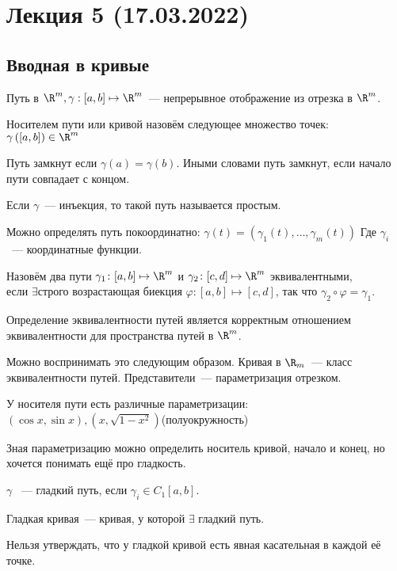 \section*{Лекция 5 (17.03.2022)}
\subsection{Вводная в кривые}
\begin{definition}
    Путь в $\R^m, \gamma : [a, b] \mapsto \R^m$~--- непрерывное отображение из отрезка в $\R^m$.
\end{definition}
\begin{definition}
    Носителем пути или кривой назовём следующее множество точек: $\gamma\left([a, b]\right)\in \R^m$
\end{definition}
\begin{definition}
    Путь замкнут если $\gamma(a) = \gamma(b)$. Иными словами путь замкнут, если начало пути совпадает с концом.
\end{definition}
\begin{definition}
    Если $\gamma$~--- инъекция, то такой путь называется
    простым.
\end{definition}
\begin{remark}
    Можно определять путь покоординатно:
    $\gamma(t) = (\gamma_1(t),\dots, \gamma_m(t))$ 
    Где $\gamma_i$~--- координатные функции.
\end{remark}
\begin{definition}
    Назовём два пути $\gamma_1\colon [a,b]\mapsto \R^m$ и
    $\gamma_2\colon [c,d]\mapsto \R^m$ эквивалентными,\\
    если $\exists \text{строго возрастающая биекция }
    \varphi\colon [a,b]\mapsto[c, d]$, так что 
    $\gamma_2\circ \varphi = \gamma_1$.
\end{definition}
\begin{remark}
    Определение эквивалентности путей является корректным отношением эквивалентности для пространства путей в $\R^m$.

    Можно воспринимать это следующим образом.
    Кривая в $\R_m$~--- класс эквивалентности путей. Представители~--- параметризация отрезком.
\end{remark}
\begin{example}
    У носителя пути есть различные параметризации:
    $(\cos x, \sin x), (x, \sqrt{1 - x^2})$(полуокружность)
\end{example}
\begin{remark}
    Зная параметризацию можно определить носитель кривой,
    начало и конец, но хочется понимать ещё про гладкость.
\end{remark}
\begin{definition}
    $\gamma$ ~--- гладкий путь, если $\gamma_i\in C_1[a,b]$.\\
\end{definition}
\begin{definition}
    Гладкая кривая~--- кривая, у которой $\exists$ гладкий путь.
\end{definition}
\begin{remark}
    Нельзя утверждать, что у гладкой кривой есть явная касательная
    в каждой её точке.
\end{remark}
